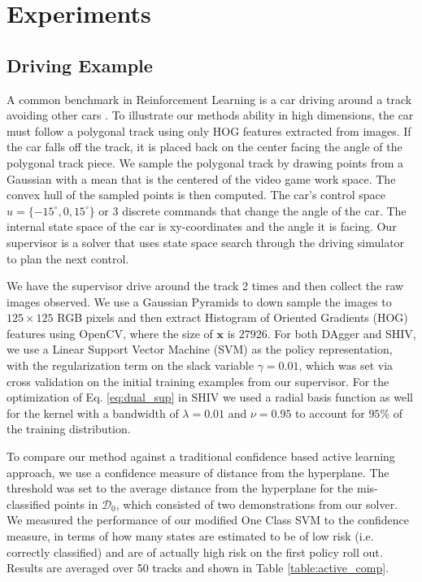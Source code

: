 \documentclass[10pt, conference]{ieeeconf}      %
\newcommand{\bx}{\mathbf{x}}
\begin{document}
\section{Experiments}
\subsection{Driving Example}
A common benchmark in Reinforcement Learning  is a car driving around a track avoiding other cars \cite{argall2009survey}. To illustrate our methods ability in high dimensions, the car must follow a polygonal track using only HOG features extracted from images. If the car falls off the track, it is placed back on the center facing the angle of the polygonal track piece. We sample the polygonal track by drawing points from a Gaussian with a mean that is the centered of the video game work space. The convex hull of the sampled points is then computed. The car's control space $u = \lbrace -15^\circ, 0, 15^\circ \rbrace$ or 3 discrete commands that change the angle of the car. The internal state space of the car is xy-coordinates and the angle it is facing. Our supervisor is a solver that uses state space search through the driving simulator to plan the next control.

We have the supervisor drive around the track 2 times and then collect the raw images observed. We use a Gaussian Pyramids to down sample the images to $125 \times 125$ RGB pixels and then extract Histogram of Oriented Gradients (HOG) features using OpenCV,  where the size of $\bx$ is $27926$. For both DAgger and SHIV, we use a Linear Support Vector Machine (SVM) as the policy representation, with the regularization term on the slack variable $\gamma=0.01$, which was set via cross validation on the initial training examples from our supervisor. For the optimization of Eq. \ref{eq:dual_sup} in SHIV we used a radial basis function as well for the kernel with a bandwidth of $\lambda=0.01$ and $\nu = 0.95$ to account for $95\%$ of the training distribution. 

To compare our method against a traditional confidence based active learning approach, we use a confidence measure  of distance from the hyperplane. The threshold was set to the average distance from the hyperplane for the mis-classified points in $\mathcal{D}_0$, which consisted of two demonstrations from our solver. We measured the performance of our modified One Class SVM to the confidence measure, in terms of how many states are estimated to be of low risk (i.e. correctly classified) and are of actually high risk on the first policy roll out. Results  are averaged over 50 tracks and shown in Table \ref{table:active_comp}. 
\end{document}
